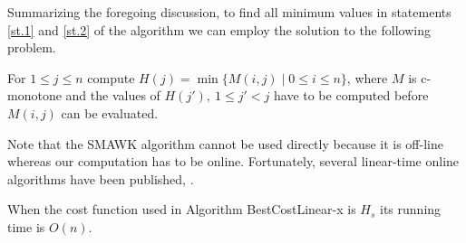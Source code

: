 Summarizing the foregoing discussion, to find all minimum values in statements \ref{st.1} and \ref{st.2} of the algorithm we can employ the solution to the following problem.
\begin{problem}
		For $1\leq j \leq n$ compute $H(j)=\min \{M(i,j) \mid 0\leq i \leq n\}$, where 
		$M$ is c-monotone and
	the values of $H(j'),\ 1\leq j'<j$ have to be computed before $M(i,j)$ can be evaluated.
\end{problem}
Note that the SMAWK algorithm cannot
be used directly because it is off-line whereas our computation has to be online.
Fortunately, several linear-time online algorithms have been published, 
\cite{klawe89,larmore91,galil92,barnoy09}.

\begin{theorem}\label{t.linear-s}
	When the cost function used in Algorithm BestCostLinear-x is $H_s$ its running time is $O(n)$.
\end{theorem}

\
